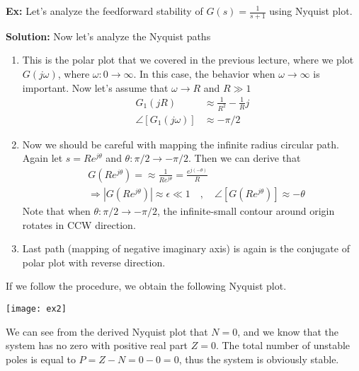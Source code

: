 \documentclass[twoside]{article}
\begin{document}
\newpage

\textbf{Ex:} Let's analyze the feedforward stability of $G(s) =
\frac{1}{s+1}$ using Nyquist plot. 

\textbf{Solution:} Now let's analyze the Nyquist paths
%
\begin{enumerate}
  \item This is the polar plot that we covered in the previous
    lecture, where we plot $G(j \omega)$, where $\omega : 0 \to
    \infty$. In this case, the behavior when $\omega \to \infty$ is
    important. Now let's assume that $\omega \to R$ and $R \gg 1$
  \begin{align*}
   G_1(j R) &\approx \frac{1}{R^2} - \frac{1}{R} j
    \\
    \angle [ G_1(j \omega) ] &\approx -\pi / 2
   \end{align*}
%
  \item Now we should be careful with mapping the infinite radius
    circular path. Again let $s = R e^{j \theta}$ and $\theta : \pi/2
    \to -\pi/2$.  Then 
   we can derive that  
   \begin{align*}
     & G \left( R e^{j \theta} \right) = \approx \frac{1}{R e^{j
       \theta}} = \frac{e^{j (-\theta)}}{R}
       \\
    &\Rightarrow | G \left( R e^{j \theta} \right) | \approx \epsilon
      \ll 1
   \quad , \quad \angle [ G \left( R e^{j \theta} \right) ] \approx -\theta
   \end{align*}
   Note that when $\theta : \pi/2 \to -\pi/2$, the infinite-small 
   contour around origin rotates in CCW direction. 
   \item Last path (mapping of negative imaginary axis) is again
   is the conjugate of polar plot with reverse direction. 
\end{enumerate}

If we follow the procedure, we obtain the following Nyquist plot. 

\vspace{6 pt}

  \begin{minipage}[h]{1\linewidth}
    \begin{center}
      \texttt{[image: ex2]}
    \end{center}
  \end{minipage}

\vspace{6 pt}

We can see from the derived Nyquist plot that $N=0$, and 
we know that the system has no zero with positive real part 
$Z =0$. The total number of unstable poles is equal to
$P = Z - N = 0 - 0 = 0$, thus the system is obviously stable. 
\end{document}
